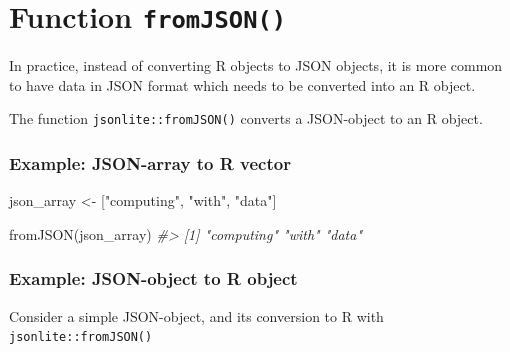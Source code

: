 \documentclass[
]{book}
\newenvironment{Shaded}{\begin{snugshade}}{\end{snugshade}}
\newcommand{\CommentTok}[1]{\textcolor[rgb]{0.56,0.35,0.01}{\textit{#1}}}
\newcommand{\FunctionTok}[1]{\textcolor[rgb]{0.00,0.00,0.00}{#1}}
\newcommand{\NormalTok}[1]{#1}
\newcommand{\OtherTok}[1]{\textcolor[rgb]{0.56,0.35,0.01}{#1}}
\newcommand{\StringTok}[1]{\textcolor[rgb]{0.31,0.60,0.02}{#1}}
\begin{document}
\hypertarget{function-fromjson}{%
\section{\texorpdfstring{Function \texttt{fromJSON()}}{Function fromJSON()}}\label{function-fromjson}}

In practice, instead of converting R objects to JSON objects, it is more
common to have data in JSON format which needs to be converted into an R object.

The function \texttt{jsonlite::fromJSON()} converts a JSON-object to an R object.

\hypertarget{example-json-array-to-r-vector}{%
\subsubsection*{Example: JSON-array to R vector}\label{example-json-array-to-r-vector}}

\begin{Shaded}
\begin{Highlighting}[]
\NormalTok{json\_array }\OtherTok{\textless{}{-}} \StringTok{\textquotesingle{}["computing", "with", "data"]\textquotesingle{}}

\FunctionTok{fromJSON}\NormalTok{(json\_array)}
\CommentTok{\#\textgreater{} [1] "computing" "with"      "data"}
\end{Highlighting}
\end{Shaded}

\hypertarget{example-json-object-to-r-object}{%
\subsubsection*{Example: JSON-object to R object}\label{example-json-object-to-r-object}}

Consider a simple JSON-object, and its conversion to R with
\texttt{jsonlite::fromJSON()}

\begin{Shaded}
\end{Shaded}
\end{document}

